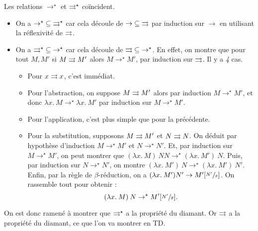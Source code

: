 \documentclass[./main]{subfiles}
\begin{document}
  \begin{lem}
    Les relations $\to^\star$ et $\rightrightarrows^\star$ coïncident.
  \end{lem}
  \begin{prv}
    \begin{itemize}
      \item On a ${\to^\star} \subseteq {\rightrightarrows^\star}$ car cela découle de ${\to} \subseteq {\rightrightarrows}$ par induction sur $\to$ en utilisant la réflexivité de $\rightrightarrows$.
      \item On a ${\rightrightarrows^\star} \subseteq {\to^\star}$ car cela découle de ${\rightrightarrows} \subseteq {\to^\star}$.
        En effet, on montre que pour tout $M, M'$ si $M \rightrightarrows M'$ alors $M \to^\star M'$, par induction sur $\rightrightarrows$. Il y a  \textit{4} cas.
        \begin{itemize}
          \item Pour $x \rightrightarrows x$, c'est immédiat. 
          \item Pour l'abstraction, on suppose $M \rightrightarrows M'$ alors par induction  $M \to^\star M'$, et donc $\lambda x.\: M \to^\star \lambda x.\: M'$ par induction sur $M \to^\star M'$.
          \item Pour l'application, c'est plus simple que pour la précédente.
          \item Pour la substitution, supposons $M \rightrightarrows M'$ et $N \rightrightarrows N$.
            On déduit par hypothèse d'induction $M \to^\star M'$ et $N \to^\star N'$.
            Et, par induction sur $M \to^\star M'$, on peut montrer que $(\lambda x.\: M)\: N N \to^\star (\lambda x.\: M') \: N$.
            Puis, par induction sur $N \to^\star N'$, on montre $(\lambda x.\: M') \: N \to^\star (\lambda x.\: M') \: N'$.
            Enfin, par la règle de $\beta$-réduction, on a $(\lambda x.\: M') N' \to M'[\sfrac{N'}{x}]$.
            On rassemble tout pour obtenir :
            \[
              (\lambda x.\: M) \: N \to^\star M'[\sfrac{N'}{x}]
            .\] 
        \end{itemize}
    \end{itemize}
  \end{prv}

  On est donc ramené à montrer que $\rightrightarrows^\star$ a la propriété du diamant.
  Or $\rightrightarrows$ a la propriété du diamant, ce que l'on va montrer en TD.
\end{document}
